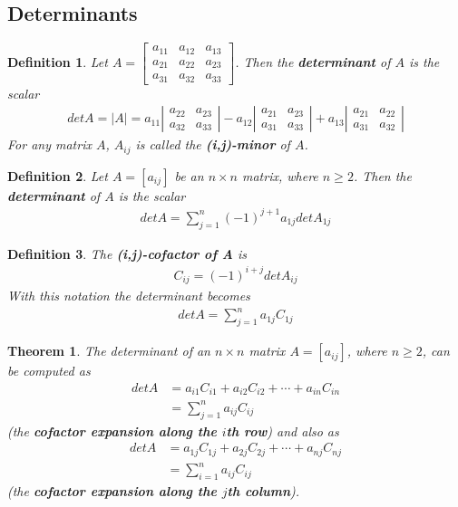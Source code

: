 \documentclass{article}
\theoremstyle{sltheorem}
\newtheorem{definition}{Definition}[section]
\newtheorem{theorem}{Theorem}[section]
\begin{document}
\subsection{Determinants}
\begin{definition}
    Let $A=\begin{bmatrix}
        a_{11} &a_{12} &a_{13}\\ 
        a_{21} &a_{22} &a_{23}\\ 
        a_{31} &a_{32} &a_{33}
    \end{bmatrix}$.
    Then the \textbf{determinant} of $A$ is the scalar
    \begin{align*}
        det A = |A| = a_{11}\left|\begin{array}{ccc}
            a_{22} &a_{23}\\ 
            a_{32} &a_{33}
        \end{array}\right| -
        a_{12}\left|\begin{array}{ccc}
            a_{21} &a_{23}\\ 
            a_{31} &a_{33}
        \end{array}\right| +
        a_{13}\left|\begin{array}{ccc}
            a_{21} &a_{22}\\ 
            a_{31} &a_{32}
        \end{array}\right|
    \end{align*}
    For any matrix $A$, $A_{ij}$ is called the \textbf{(i,j)-minor} of $A$.
\end{definition}
\begin{definition}
    Let $A=[a_{ij}]$ be an $n\times n$ matrix, where $n\geq 2$. Then the \textbf{determinant} of $A$ is the scalar
    \begin{align*}
        det A = \sum_{j=1}^n (-1)^{j+1}a_{1j}det A_{1j}
    \end{align*}
\end{definition}
\begin{definition}
    The \textbf{(i,j)-cofactor of A} is
    \begin{align*}
        C_{ij}=(-1)^{i+j}det A_{ij}
    \end{align*}
    With this notation the determinant becomes
    \begin{align*}
        det A = \sum^n_{j=1} a_{1j}C_{1j}
    \end{align*}
\end{definition}
\begin{theorem}
    The determinant of an $n\times n$ matrix $A=[a_{ij}]$, where $n\geq 2$, can be computed as
    \begin{align*}
        det A &= a_{i1}C_{i1}+a_{i2}C_{i2} + \cdots + a_{in}C_{in}\\
        &= \sum_{j=1}^n a_{ij}C_{ij}
    \end{align*}
    (the \textbf{cofactor expansion along the $i$th row}) and also as
    \begin{align*}
        det A &= a_{1j}C_{1j}+a_{2j}C_{2j} + \cdots + a_{nj}C_{nj}\\
        &= \sum_{i=1}^n a_{ij}C_{ij}
    \end{align*}
    (the \textbf{cofactor expansion along the $j$th column}).
\end{theorem}
\end{document}
